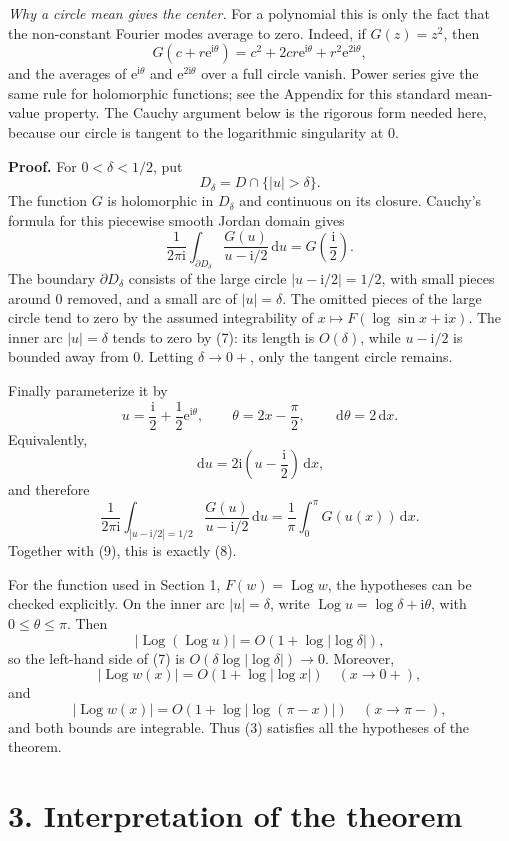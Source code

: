 \documentclass[12pt]{article}
\newcommand{\dd}{\,\mathrm{d}}
\newcommand{\ii}{\mathrm{i}}
\newcommand{\e}{\mathrm{e}}
\newcommand{\Log}{\operatorname{Log}}
\begin{document}
\textit{Why a circle mean gives the center.}
For a polynomial this is only the fact that the non-constant Fourier modes
average to zero. Indeed, if \(G(z)=z^2\), then
\[
G(c+r\e^{\ii\theta})
=c^2+2cr\e^{\ii\theta}+r^2\e^{2\ii\theta},
\]
and the averages of \(\e^{\ii\theta}\) and \(\e^{2\ii\theta}\) over a full
circle vanish. Power series give the same rule for holomorphic functions;
see the Appendix for this standard mean-value property. The Cauchy argument
below is the rigorous form needed here, because our circle is tangent to
the logarithmic singularity at \(0\).

\textbf{Proof.}
For \(0<\delta<1/2\), put
\[
D_\delta=D\cap\{|u|>\delta\}.
\]
The function \(G\) is holomorphic in \(D_\delta\) and continuous on its
closure. Cauchy's formula for this piecewise smooth Jordan domain gives
\[
\frac{1}{2\pi\ii}\int_{\partial D_\delta}
\frac{G(u)}{u-\ii/2}\dd u
=G\!\left(\frac{\ii}{2}\right).
\tag{9}
\]
The boundary \(\partial D_\delta\) consists of the large circle
\(|u-\ii/2|=1/2\), with small pieces around \(0\) removed, and a small arc
of \(|u|=\delta\). The omitted pieces of the large circle tend to zero by
the assumed integrability of
\(x\mapsto F(\log\sin x+\ii x)\). The inner arc \(|u|=\delta\) tends to
zero by (7): its length is \(O(\delta)\), while \(u-\ii/2\) is bounded away
from \(0\). Letting \(\delta\to0+\), only the tangent circle remains.

Finally parameterize it by
\[
u=\frac{\ii}{2}+\frac12\e^{\ii\theta},
\qquad
\theta=2x-\frac{\pi}{2},
\qquad
\dd\theta=2\dd x.
\]
Equivalently,
\[
\dd u=2\ii\left(u-\frac{\ii}{2}\right)\dd x,
\]
and therefore
\[
\frac{1}{2\pi\ii}\int_{|u-\ii/2|=1/2}
\frac{G(u)}{u-\ii/2}\dd u
=\frac1\pi\int_0^\pi G(u(x))\dd x.
\]
Together with (9), this is exactly (8).

For the function used in Section 1, \(F(w)=\Log w\), the hypotheses can be
checked explicitly. On the inner arc \(|u|=\delta\), write
\(\Log u=\log\delta+\ii\theta\), with \(0\le\theta\le\pi\). Then
\[
|\Log(\Log u)|=O\!\left(1+\log|\log\delta|\right),
\]
so the left-hand side of (7) is
\(O(\delta\log|\log\delta|)\to0\). Moreover,
\[
|\Log w(x)|=O\!\left(1+\log|\log x|\right)
\quad (x\to0+),
\]
and
\[
|\Log w(x)|=O\!\left(1+\log|\log(\pi-x)|\right)
\quad (x\to\pi-),
\]
and both bounds are integrable. Thus (3) satisfies all the hypotheses of the theorem.

\section*{3. Interpretation of the theorem}
\end{document}
